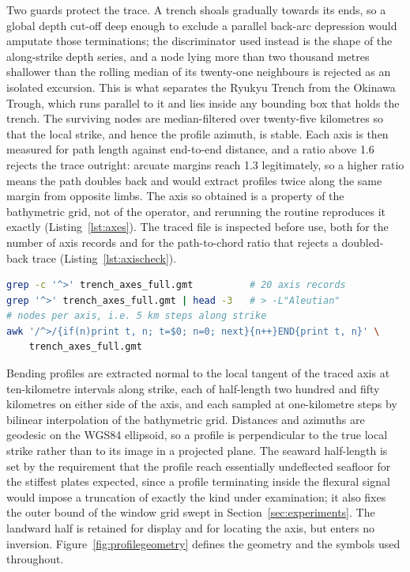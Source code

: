 \documentclass[final]{agujournal2019}
\begin{document}
Two guards protect the trace. A trench shoals gradually towards its ends, so a
global depth cut-off deep enough to exclude a parallel back-arc depression would
amputate those terminations; the discriminator used instead is the shape of the
along-strike depth series, and a node lying more than two thousand metres
shallower than the rolling median of its twenty-one neighbours is rejected as an
isolated excursion. This is what separates the Ryukyu Trench from the Okinawa
Trough, which runs parallel to it and lies inside any bounding box that holds
the trench. The surviving nodes are median-filtered over twenty-five kilometres
so that the local strike, and hence the profile azimuth, is stable. Each axis is
then measured for path length against end-to-end distance, and a ratio above 1.6
rejects the trace outright: arcuate margins reach 1.3 legitimately, so a higher
ratio means the path doubles back and would extract profiles twice along the
same margin from opposite limbs. The axis so obtained is a property of the
bathymetric grid, not of the operator, and rerunning the routine reproduces it
exactly (Listing~\ref{lst:axes}). The traced file is inspected before use, both
for the number of axis records and for the path-to-chord ratio that rejects a
doubled-back trace (Listing~\ref{lst:axischeck}).

\begin{lstlisting}[caption={Inspecting the traced axes: one record per trench,
and the along-path node count that fixes the number of profiles each margin can
carry.},label={lst:axischeck},language=bash]
grep -c '^>' trench_axes_full.gmt          # 20 axis records
grep '^>' trench_axes_full.gmt | head -3   # > -L"Aleutian"
# nodes per axis, i.e. 5 km steps along strike
awk '/^>/{if(n)print t, n; t=$0; n=0; next}{n++}END{print t, n}' \
    trench_axes_full.gmt
\end{lstlisting}

Bending profiles are extracted normal to the local tangent of the traced axis at
ten-kilometre intervals along strike, each of half-length two hundred and fifty
kilometres on either side of the axis, and each sampled at one-kilometre steps
by bilinear interpolation of the bathymetric grid. Distances and azimuths are
geodesic on the WGS84 ellipsoid, so a profile is perpendicular to the true local
strike rather than to its image in a projected plane. The seaward
half-length is set by the requirement that the profile reach essentially
undeflected seafloor for the stiffest plates expected, since a profile
terminating inside the flexural signal would impose a truncation of exactly the
kind under examination; it also fixes the outer bound of the window grid swept
in Section~\ref{sec:experiments}. The landward half is retained for display and
for locating the axis, but enters no inversion.
Figure~\ref{fig:profilegeometry} defines the geometry and the symbols used
throughout.
\end{document}
